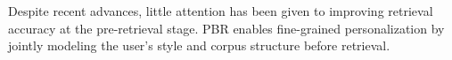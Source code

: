 Despite recent advances, little attention has been given to improving retrieval accuracy at the pre-retrieval stage. PBR enables fine-grained personalization by jointly modeling the user’s style and corpus structure before retrieval.







